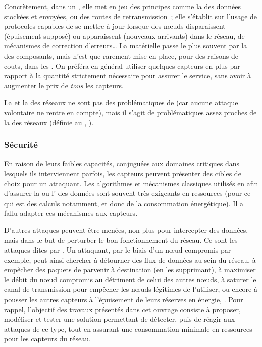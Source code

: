 Concrètement, dans un \rcsfs, elle met en jeu des principes comme la  des données stockées et envoyées, ou des routes de retransmission~\cite{SP10}; elle s'établit sur l'usage de protocoles capables de se mettre à jour lorsque des nœuds disparaissent (épuisement supposé) ou apparaissent (nouveaux arrivants) dans le réseau, de mécanismes de correction d'erreurs…
La \resilience matérielle passe le plus souvent par la  des composants, mais n'est que rarement mise en place, pour des raisons de couts, dans les \rcs.
On préféra en général utiliser quelques capteurs en plus par rapport à la quantité strictement nécessaire pour assurer le service, sans avoir à augmenter le prix de \emph{tous} les capteurs.

La  et la \resilience des réseaux ne sont pas des problématiques de \secu (car aucune attaque volontaire ne rentre en compte), mais il s'agit de problématiques assez proches de la  des réseaux (définie au , ).

        \subsubsection{Sécurité}
En raison de leurs faibles capacités, conjuguées aux domaines critiques dans lesquels ils interviennent parfois, les capteurs peuvent présenter des cibles de choix pour un attaquant.
Les algorithmes et mécanismes classiques utilisés en  afin d'assurer la  ou l' des données sont souvent très exigeants en ressources (pour ce qui est des calculs notamment, et donc de la consommation énergétique).
Il a fallu adapter ces mécanismes aux capteurs.

D'autres attaques peuvent être menées, non plus pour intercepter des données, mais dans le but de perturber le bon fonctionnement du réseau.
Ce sont les attaques dites par \textit{\dds}.
Un attaquant, par le biais d'un nœud compromis par exemple, peut ainsi chercher à détourner des flux de données au sein du réseau, à empêcher des paquets de parvenir à destination (en les supprimant), à maximiser le débit du nœud compromis au détriment de celui des autres nœuds, à saturer le canal de transmission pour empêcher les nœuds légitimes de l'utiliser, ou encore à pousser les autres capteurs à l'épuisement de leurs réserves en énergie, \etc.
Pour rappel, l'objectif des travaux présentés dans cet ouvrage consiste à proposer, modéliser et tester une solution permettant de détecter, puis de réagir aux attaques de ce type, tout en assurant une consommation minimale en ressources pour les capteurs du réseau.


